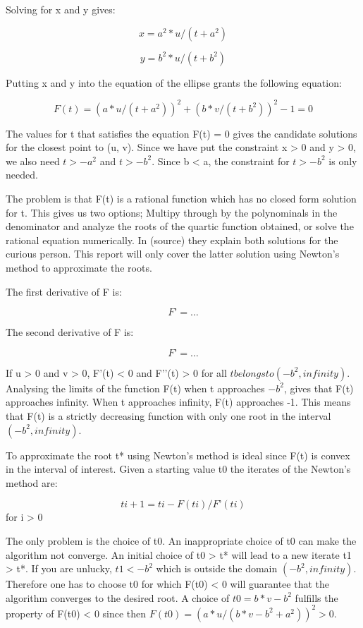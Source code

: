 \documentclass[paper=a4, fontsize=11pt,twoside]{scrartcl}		%
\begin{document}
\begin{flushleft}
Solving for x and y gives:

$$x = a^2*u/(t+a^2)$$

$$y = b^2*u/(t+b^2)$$

Putting x and y into the equation of the ellipse grants the following equation:

$$F(t) = (a*u/(t+a^2))^2 + (b*v/(t+b^2))^2 -1 = 0$$

The values for t that satisfies the equation F(t) = 0 gives the candidate solutions for the closest point to (u, v). Since we have put the constraint x > 0 and y > 0, we also need $t > -a^2$ and $t > -b^2$. Since b < a, the constraint for $t > -b^2$ is only needed. \newline

The problem is that F(t) is a rational function which has no closed form solution for t. This gives us two options; Multipy through by the polynominals in the denominator and analyze the roots of the quartic function obtained, or solve the rational equation numerically. In (source) they explain both solutions for the curious person. This report will only cover the latter solution using Newton’s method to approximate the roots. \newline

The first derivative of F is:

$$F’ = …$$

The second derivative of F is:

$$F’ = …$$

If u > 0 and v > 0, F’(t) < 0 and F’’(t) > 0 for all $t belongs to (-b^2, infinity)$. Analysing the limits of the function F(t) when t approaches $-b^2$, gives that F(t) approaches infinity. When t approaches infinity, F(t) approaches -1. This means that F(t) is a strictly decreasing function with only one root in the interval $(-b^2, infinity)$.

To approximate the root t* using Newton’s method is ideal since F(t) is convex in the interval of interest. Given a starting value t0 the iterates of the Newton's method are:

$$ti+1 = ti - F(ti)/F’(ti)$$  for i > 0

The only problem is the choice of t0. An inappropriate choice of t0 can make the algorithm not converge. An initial choice of t0 > t* will lead to a new iterate t1 > t*. If you are unlucky, $t1 < -b^2$ which is outside the domain $(-b^2, infinity)$. Therefore one has to choose t0 for which F(t0) < 0 will guarantee that the algorithm converges to the desired root. A choice of $t0 = b*v - b^2$ fulfills the property of F(t0) < 0 since then $F(t0) = (a*u/(b*v - b^2 + a^2 ))^2 > 0$.


\end{flushleft}
\end{document}
